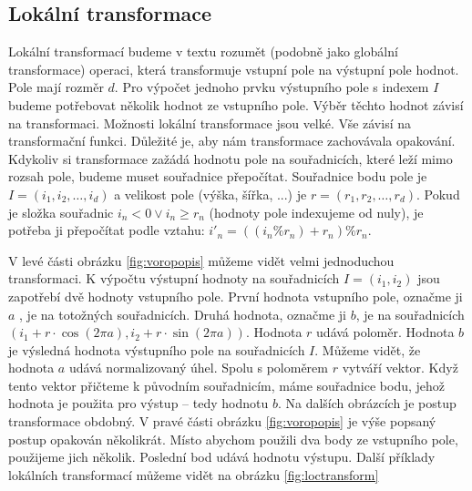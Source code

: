 \subsection{Lokální transformace}
Lokální transformací budeme v textu rozumět (podobně jako globální transformace) operaci, která transformuje vstupní pole na výstupní pole hodnot.
Pole mají rozměr $d$.
Pro výpočet jednoho prvku výstupního pole s indexem $I$ budeme potřebovat několik hodnot ze vstupního pole.
Výběr těchto hodnot závisí na transformaci.
Možnosti lokální transformace jsou velké.
Vše závisí na transformační funkci.
Důležité je, aby nám transformace zachovávala opakování.
Kdykoliv si transformace zažádá  hodnotu pole na souřadnicích, které leží mimo rozsah pole, budeme muset souřadnice přepočítat.
Souřadnice bodu pole je $I=(i_1,i_2,\dotsc,i_d)$ a velikost pole (výška, šířka, ...) je $r=(r_1,r_2,\dotsc,r_d)$.
Pokud je složka souřadnic $i_n<0 \vee i_n \geq r_n$ (hodnoty pole indexujeme od nuly), je potřeba ji přepočítat podle vztahu: $i'_n= ((i_n \% r_n)+r_n)\% r_n$.

V levé části obrázku \ref{fig:voropopis} můžeme vidět velmi jednoduchou transformaci.
K výpočtu výstupní hodnoty na souřadnicích $I=(i_1,i_2)$ jsou zapotřebí dvě hodnoty vstupního pole.
První hodnota vstupního pole, označme ji $a$ , je na totožných souřadnicích.
Druhá hodnota, označme ji $b$, je na souřadnicích $(i_1 + r\cdot \cos(2\pi a),i_2+r\cdot \sin(2\pi a))$.
Hodnota $r$ udává poloměr.
Hodnota $b$ je výsledná hodnota výstupního pole na souřadnicích $I$.
Můžeme vidět, že hodnota $a$ udává normalizovaný úhel.
Spolu s poloměrem $r$ vytváří vektor.
Když tento vektor přičteme k původním souřadnicím, máme souřadnice bodu, jehož hodnota je použita pro výstup – tedy hodnotu $b$.
Na dalších obrázcích je postup transformace obdobný.
V pravé části obrázku \ref{fig:voropopis} je výše popsaný postup opakován několikrát.
Místo abychom použili dva body ze vstupního pole, použijeme jich několik.
Poslední bod udává hodnotu výstupu.
Další příklady lokálních transformací můžeme vidět na obrázku \ref{fig:loctransform}

